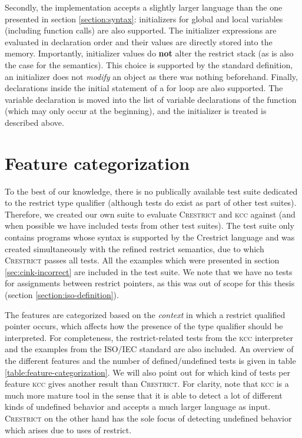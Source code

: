 Secondly, the implementation accepts a slightly larger language than the one presented in section \ref{section:syntax}:
initializers for global and local variables (including function calls) are also supported.
The initializer expressions are evaluated in declaration order and their values are directly stored into the memory.
Importantly, initializer values do \textbf{not} alter the restrict stack (as is also the case for the \cink{} semantics).
This choice is supported by the standard definition, \ie an initializer does not \textit{modify} an object as there was
nothing beforehand.
Finally, declarations inside the initial statement of a for loop are also supported.
The variable declaration is moved into the list of variable declarations of the function 
(which may only occur at the beginning), and the initializer is treated is described above.

\section{Feature categorization}\label{section:feature-categorization}
To the best of our knowledge, there is no publically available test suite dedicated to
the restrict type qualifier (although tests do exist as part of other test suites).
Therefore, we created our own suite to evaluate \textsc{Crestrict} and \textsc{kcc} against
(and when possible we have included tests from other test suites).
The test suite only contains programs whose syntax is supported by the Crestrict language
and was created simultaneously with the refined restrict semantics, due to which \textsc{Crestrict} passes all tests.
All the examples which were presented in section \ref{sec:cink-incorrect} are included in the test suite.
We note that we have no tests for assignments between restrict pointers,
as this was out of scope for this thesis (section \ref{section:iso-definition}).

The features are categorized based on the \textit{context} in which a restrict qualified pointer occurs,
which affects how the presence of the type qualifier should be interpreted.
For completeness, the restrict-related tests from the \textsc{kcc} interpreter and the
examples from the ISO/IEC standard are also included.
An overview of the different features and the number of defined/undefined tests is given in table \ref{table:feature-categorization}.
We will also point out for which kind of tests per feature \textsc{kcc} gives another result than \textsc{Crestrict}. 
For clarity, note that \textsc{kcc} is a much more mature tool in the sense that it is able
to detect a lot of different kinds of undefined behavior and accepts a much larger language as input.
\textsc{Crestrict} on the other hand has the sole focus of detecting undefined behavior which arises due to uses of restrict.

